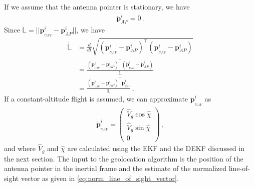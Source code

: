 If we assume that the antenna pointer is stationary, we have
\begin{align*}
\boldsymbol{\dot{p}}_{AP}^i=0\,.
\end{align*}
Since $\mathbb{L}=\lvert\lvert \boldsymbol{p}_{_{UAV}}^i-\boldsymbol{p}_{AP}^i\rvert\rvert$, we have
\begin{align*}
\mathbb{\dot{L}}&=\frac{d}{dt}\sqrt{(\boldsymbol{p}_{_{UAV}}^i-\boldsymbol{p}_{AP}^i)^\top(\boldsymbol{p}_{_{UAV}}^i-\boldsymbol{p}_{AP}^i)} \\
&=\frac{(\boldsymbol{p}_{_{UAV}}^i-\boldsymbol{p}_{AP}^i)^\top(\dot{\boldsymbol{p}}_{_{UAV}}^i-\dot{\boldsymbol{p}}_{AP}^i)}{\mathbb{L}} \\
&=\frac{(\boldsymbol{p}_{_{UAV}}^i-\boldsymbol{p}_{AP}^i)^\top\dot{\boldsymbol{p}}_{_{UAV}}^i}{\mathbb{L}}\,,
\end{align*}
If a constant-altitude flight is assumed, we can approximate  $\dot{\boldsymbol{p}}_{_{UAV}}^i$ as
\begin{align*}
\dot{\boldsymbol{p}}_{_{UAV}}^i=
\begin{pmatrix}
\hat{V}_g\cos\hat{\chi} \\
\hat{V}_g\sin\hat{\chi} \\
0
\end{pmatrix}\,,
\end{align*}
and where $\hat{V}_g$ and $\hat{\chi}$ are calculated using the EKF and the DEKF discussed in the next section. The input to the geolocation algorithm is the position of the antenna pointer in the inertial frame and the estimate of the normalized line-of-sight vector as given in \ref{eq:norm_line_of_sight_vector}.


